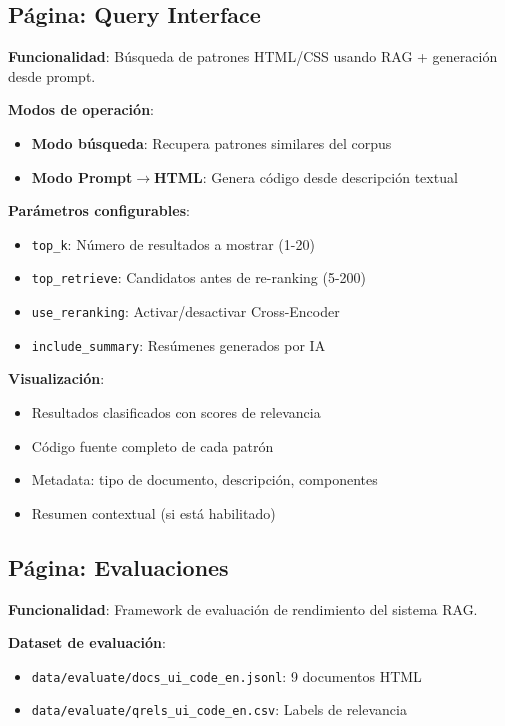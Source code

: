 \documentclass[12pt,a4paper]{article}
\begin{document}
\subsection{Página: Query Interface}

\textbf{Funcionalidad}: Búsqueda de patrones HTML/CSS usando RAG + generación desde prompt.

\textbf{Modos de operación}:
\begin{itemize}
    \item \textbf{Modo búsqueda}: Recupera patrones similares del corpus
    \item \textbf{Modo Prompt$\rightarrow$HTML}: Genera código desde descripción textual
\end{itemize}

\textbf{Parámetros configurables}:
\begin{itemize}
    \item \texttt{top\_k}: Número de resultados a mostrar (1-20)
    \item \texttt{top\_retrieve}: Candidatos antes de re-ranking (5-200)
    \item \texttt{use\_reranking}: Activar/desactivar Cross-Encoder
    \item \texttt{include\_summary}: Resúmenes generados por IA
\end{itemize}

\textbf{Visualización}:
\begin{itemize}
    \item Resultados clasificados con scores de relevancia
    \item Código fuente completo de cada patrón
    \item Metadata: tipo de documento, descripción, componentes
    \item Resumen contextual (si está habilitado)
\end{itemize}

\subsection{Página: Evaluaciones}

\textbf{Funcionalidad}: Framework de evaluación de rendimiento del sistema RAG.

\textbf{Dataset de evaluación}:
\begin{itemize}
    \item \texttt{data/evaluate/docs\_ui\_code\_en.jsonl}: 9 documentos HTML
    \item \texttt{data/evaluate/qrels\_ui\_code\_en.csv}: Labels de relevancia
\end{itemize}
\end{document}
